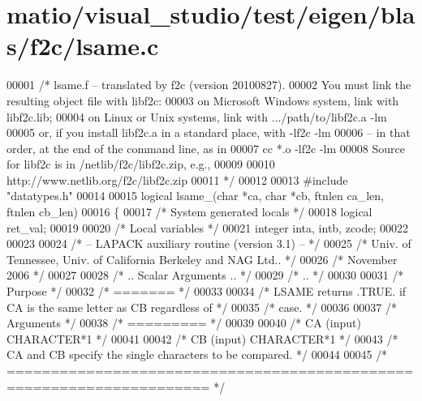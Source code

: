 \hypertarget{matio_2visual__studio_2test_2eigen_2blas_2f2c_2lsame_8c_source}{}\section{matio/visual\+\_\+studio/test/eigen/blas/f2c/lsame.c}
\label{matio_2visual__studio_2test_2eigen_2blas_2f2c_2lsame_8c_source}

\begin{DoxyCode}
00001 \textcolor{comment}{/* lsame.f -- translated by f2c (version 20100827).}
00002 \textcolor{comment}{   You must link the resulting object file with libf2c:}
00003 \textcolor{comment}{    on Microsoft Windows system, link with libf2c.lib;}
00004 \textcolor{comment}{    on Linux or Unix systems, link with .../path/to/libf2c.a -lm}
00005 \textcolor{comment}{    or, if you install libf2c.a in a standard place, with -lf2c -lm}
00006 \textcolor{comment}{    -- in that order, at the end of the command line, as in}
00007 \textcolor{comment}{        cc *.o -lf2c -lm}
00008 \textcolor{comment}{    Source for libf2c is in /netlib/f2c/libf2c.zip, e.g.,}
00009 \textcolor{comment}{}
00010 \textcolor{comment}{        http://www.netlib.org/f2c/libf2c.zip}
00011 \textcolor{comment}{*/}
00012 
00013 \textcolor{preprocessor}{#include "datatypes.h"}
00014 
00015 logical lsame\_(\textcolor{keywordtype}{char} *ca, \textcolor{keywordtype}{char} *cb, ftnlen ca\_len, ftnlen cb\_len)
00016 \{
00017     \textcolor{comment}{/* System generated locals */}
00018     logical ret\_val;
00019 
00020     \textcolor{comment}{/* Local variables */}
00021     integer inta, intb, zcode;
00022 
00023 
00024 \textcolor{comment}{/*  -- LAPACK auxiliary routine (version 3.1) -- */}
00025 \textcolor{comment}{/*     Univ. of Tennessee, Univ. of California Berkeley and NAG Ltd.. */}
00026 \textcolor{comment}{/*     November 2006 */}
00027 
00028 \textcolor{comment}{/*     .. Scalar Arguments .. */}
00029 \textcolor{comment}{/*     .. */}
00030 
00031 \textcolor{comment}{/*  Purpose */}
00032 \textcolor{comment}{/*  ======= */}
00033 
00034 \textcolor{comment}{/*  LSAME returns .TRUE. if CA is the same letter as CB regardless of */}
00035 \textcolor{comment}{/*  case. */}
00036 
00037 \textcolor{comment}{/*  Arguments */}
00038 \textcolor{comment}{/*  ========= */}
00039 
00040 \textcolor{comment}{/*  CA      (input) CHARACTER*1 */}
00041 
00042 \textcolor{comment}{/*  CB      (input) CHARACTER*1 */}
00043 \textcolor{comment}{/*          CA and CB specify the single characters to be compared. */}
00044 
00045 \textcolor{comment}{/* ===================================================================== */}

\end{DoxyCode}
